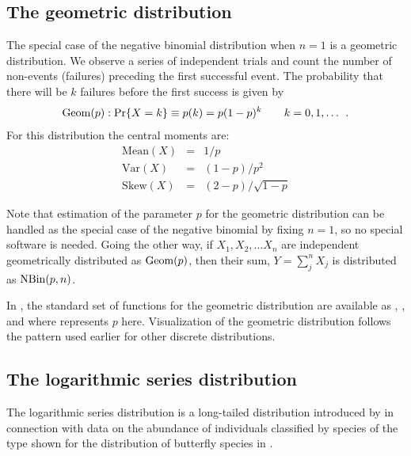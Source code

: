 \documentclass[10pt,krantz2]{krantz}\usepackage[]{graphicx}\usepackage[]{color}
\begin{document}

\subsection{The geometric distribution}\label{sec:geometric}
The special case of the negative binomial distribution when $n=1$
is a geometric distribution.
We observe a series of independent trials and count the number
of non-events (failures) preceding the first successful event.
The probability that there will be  $k$ failures before the first
success
is given by
\begin{equation}\label{eq:geomf}
\Geom(p):   \Pr \{ X = k \} \equiv p ( k )  =
   p (1-p)^k
  \quad\quad k = 0, 1, \dots
  \period
\end{equation}
For this distribution the central moments are:
\begin{eqnarray*}
\textrm{Mean}(X) & = & 1 / p\\
\textrm{Var}(X) &  = & (1-p) / p^2 \\
\textrm{Skew}(X) & = & (2-p) / \sqrt{1-p}
\end{eqnarray*}

Note that estimation of the parameter $p$ for the geometric distribution
can be handled as the special case of the negative binomial by fixing $n=1$,
so no special software is needed.
Going the other way, if $X_1, X_2, \dots X_n$ are independent geometrically
distributed as $\Geom(p)$, then their sum, $Y = \sum_j^n X_j$ is distributed
as $\NBin(p, n)$.

In \R, the standard set of functions for the geometric distribution are
available as
,
,
 and
 where  represents $p$ here.
Visualization of the geometric distribution follows the pattern used earlier
for other discrete distributions.


\subsection{The logarithmic series distribution}
The logarithmic series distribution is a long-tailed distribution
introduced by
\citet{Fisher-etal:43}
in connection with data on the abundance of individuals
classified by species of the type shown for the distribution of butterfly
species
in .
\end{document}
